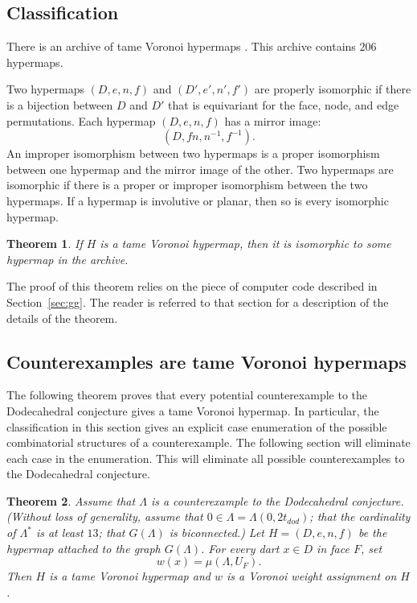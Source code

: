 \documentclass{article} %
\newtheorem{theorem}{Theorem}[section]
\begin{document}
\subsection{Classification}\label{sec:class}

There is an archive of tame Voronoi hypermaps
\cite{McLaughlin:2008:KeplerCode}. This archive contains $206$
hypermaps.

Two hypermaps $(D,e,n,f)$ and $(D',e',n',f')$ are properly isomorphic if there
is a bijection between $D$ and $D'$ that is equivariant for the face, node, and
edge permutations.  Each hypermap $(D,e,n,f)$ has a mirror image:
  $$
  (D,f n, n^{-1},f^{-1}).
  $$
  An improper
isomorphism between two hypermaps is a proper isomorphism between one hypermap and the
mirror image of the other.
Two hypermaps are isomorphic if there is a proper or improper isomorphism between
the two hypermaps. If a hypermap is involutive or planar, then so is every isomorphic
hypermap.

\begin{theorem}  If $H$ is a tame Voronoi hypermap, then it is isomorphic to
some hypermap in the archive.
\end{theorem}

The proof of this theorem relies on the piece of 
computer code described in Section~\ref{sec:gg}.  The reader is referred to that section
for a description of the details of the theorem.

\subsection{Counterexamples are tame Voronoi hypermaps}

The following theorem proves that every potential counterexample to the Dodecahedral
conjecture gives a tame Voronoi hypermap.  In particular, the classification
in this section gives an explicit case enumeration of the possible combinatorial structures
of a counterexample.  The following section will eliminate each case in the enumeration.
This will eliminate all possible counterexamples to the Dodecahedral conjecture.

\begin{theorem}  Assume that $\Lambda$ is a counterexample to the Dodecahedral
conjecture.  (Without loss of generality,  assume that $0\in\Lambda=\Lambda(0,2t_{dod})$;
that the cardinality of $\Lambda^*$ is at least $13$; that $G(\Lambda)$ is biconnected.)  Let $H=(D,e,n,f)$ be the hypermap attached to the graph $G(\Lambda)$.
 For every dart $x\in D$ in face $F$, set
$$w(x) = \mu(\Lambda,U_F).$$
Then $H$ is a tame Voronoi hypermap and $w$ is a Voronoi weight assignment on $H$.
\end{theorem}
\end{document}
